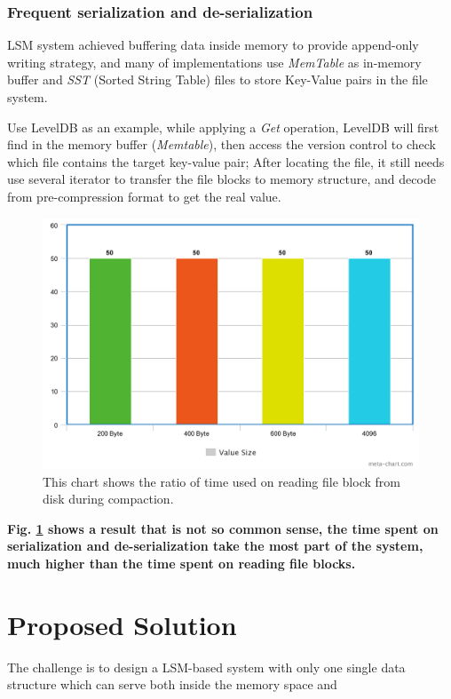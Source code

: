 \subsubsection{Frequent serialization and de-serialization}

LSM system achieved buffering data inside memory to provide append-only writing strategy, and many of implementations use \textit{MemTable} as in-memory buffer and \textit{SST} (Sorted String Table) files to store Key-Value pairs in the file system. 

Use LevelDB\cite{LevelDBo44:online} as an example, while applying a \textit{Get} operation, LevelDB will first find in the memory buffer (\textit{Memtable}), then access the version control to check which file contains the target key-value pair; After locating the file, it still needs use several iterator to transfer the file blocks to memory structure, and decode from pre-compression format to get the real value. 

\begin{figure}
	\centering
	\includegraphics[width=0.7\columnwidth]{fig/meta-chart}
	\caption{This chart shows the ratio of time used on reading file block from disk during compaction.}
	\label{fig:file_read_ratio}
\end{figure}

\textbf{Fig. \ref{fig:file_read_ratio} shows a result that is not so common sense, the time spent on serialization and de-serialization take the most part of the system, much higher than the time spent on reading file blocks.}

\section{Proposed Solution}
The challenge is to design a LSM-based system with only one single data structure which can serve both inside the memory space and 
\subsubsection{}







